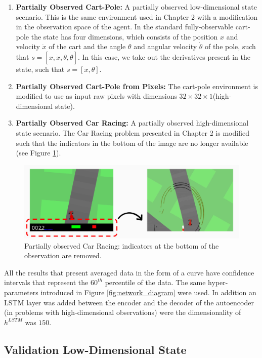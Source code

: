 \begin{enumerate}
    \item \textbf{Partially Observed Cart-Pole:} A partially observed low-dimensional state scenario. This is the same environment used in Chapter 2 with a modification in the observation space of the agent. In the standard fully-observable cart-pole the state has four dimensions, which consists of the position $x$ and velocity $\dot x$ of the cart and the angle $\theta$ and angular velocity $\dot \theta$ of the pole, such that $s=[x, \dot x, \theta, \dot \theta]$. In this case, we take out the derivatives present in the state, such that $s=[x, \theta]$.
    \item \textbf{Partially Observed Cart-Pole from Pixels:} The cart-pole environment is modified to use as input raw pixels with dimensions $32\times32\times1$(high-dimensional state). 
    \item \textbf{Partially Observed Car Racing:} A partially observed high-dimensional state scenario. The Car Racing problem presented in Chapter 2 is modified such that the indicators in the bottom of the image are no longer available (see Figure \ref{fig:no_inds_car_racing}). 
\end{enumerate}

\begin{figure}[h]
    \centering
    \includegraphics[width=0.8\linewidth]{imagenes/cap4/car_racing_no_inds.PNG}
    \caption{Partially observed Car Racing: indicators at the bottom of the observation are removed.}
    \label{fig:no_inds_car_racing}
\end{figure}

All the results that present averaged data in the form of a curve have confidence intervals that represent the $60^{th}$ percentile of the data. The same hyper-parameters introduced in Figure \ref{fig:network_diagram} were used. In addition an LSTM layer was added between the encoder and the decoder of the autoencoder (in problems with high-dimensional observations) were the dimensionality of $h^{LSTM}$ was $150$.

\subsection{Validation Low-Dimensional State}

